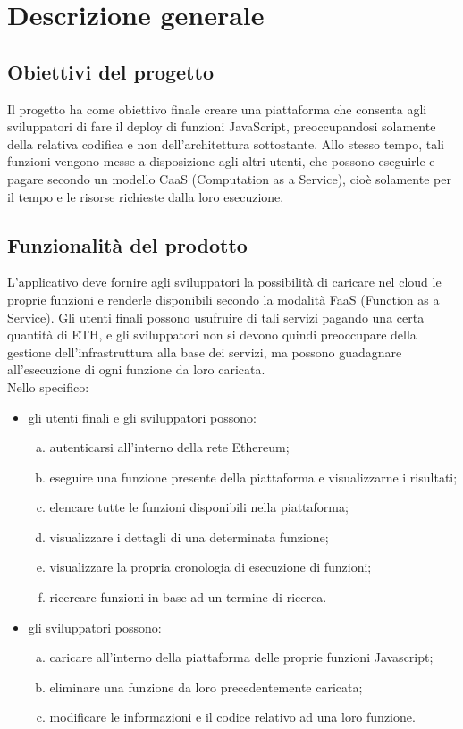 \section{Descrizione generale}

\subsection{Obiettivi del progetto}
Il progetto \NomeProgetto{} ha come obiettivo finale creare una piattaforma che consenta agli sviluppatori di fare il deploy di funzioni JavaScript, preoccupandosi solamente della relativa codifica e non dell'architettura sottostante. Allo stesso tempo, tali funzioni vengono messe a disposizione agli altri utenti, che possono eseguirle e pagare secondo un modello CaaS (Computation as a Service), cioè solamente per il tempo e le risorse richieste dalla loro esecuzione.

\subsection{Funzionalità del prodotto}
L'applicativo deve fornire agli sviluppatori la possibilità di caricare nel cloud le proprie funzioni e renderle disponibili secondo la modalità FaaS (Function as a Service). Gli utenti finali possono usufruire di tali servizi pagando una certa quantità di ETH, e gli sviluppatori non si devono quindi preoccupare della gestione dell'infrastruttura alla base dei servizi, ma possono guadagnare all'esecuzione di ogni funzione da loro caricata. \\
Nello specifico: 
	\begin{itemize}
		\item gli utenti finali e gli sviluppatori possono:
		\begin{enumerate}[a.]
			\item autenticarsi all'interno della rete Ethereum;
			\item eseguire una funzione presente della piattaforma e visualizzarne i risultati;
			\item elencare tutte le funzioni disponibili nella piattaforma;
			\item visualizzare i dettagli di una determinata funzione;
			\item visualizzare la propria cronologia di esecuzione di funzioni;
			\item ricercare funzioni in base ad un termine di ricerca.
		\end{enumerate}

		\item gli sviluppatori possono:
		\begin{enumerate}[a.]
			\item caricare all'interno della piattaforma delle proprie funzioni Javascript;
			\item eliminare una funzione da loro precedentemente caricata;
			\item modificare le informazioni e il codice relativo ad una loro funzione.
		\end{enumerate}
	\end{itemize}
